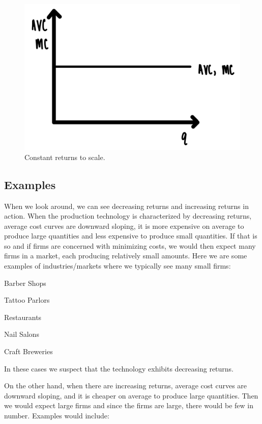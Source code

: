 \documentclass[
]{book}
\begin{document}
\begin{figure}

{\centering \includegraphics[width=0.75\linewidth]{img/supply/fig4} 

}

\caption{Constant returns to scale.}\label{fig:supply04}
\end{figure}

\hypertarget{examples-3}{%
\subsection{Examples}\label{examples-3}}

When we look around, we can see decreasing returns and increasing returns in action. When the production technology is characterized by decreasing returns, average cost curves are downward sloping, it is more expensive on average to produce large quantities and less expensive to produce small quantities. If that is so and if firms are concerned with minimizing costs, we would then expect many firms in a market, each producing relatively small amounts. Here we are some examples of industries/markets where we typically see many small firms:

\begin{center}
Barber Shops

Tattoo Parlors

Restaurants

Nail Salons

Craft Breweries

\end{center}

In these cases we suspect that the technology exhibits decreasing returns.

On the other hand, when there are increasing returns, average cost curves are downward sloping, and it is cheaper on average to produce large quantities. Then we would expect large firms and since the firms are large, there would be few in number. Examples would include:
\end{document}

